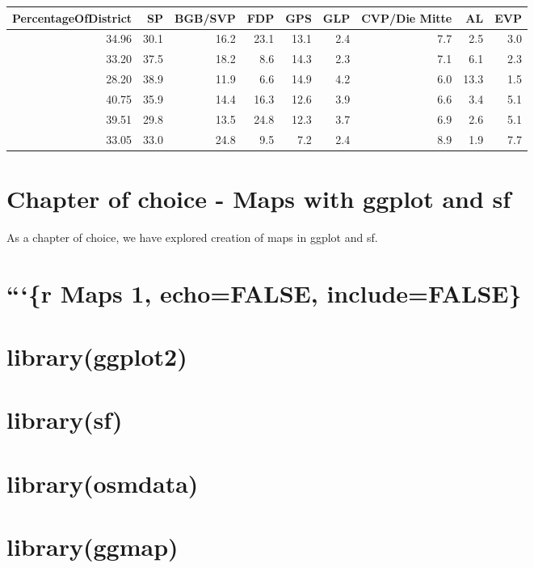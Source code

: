 \documentclass[
]{article}
\begin{document}
\begin{longtable}[]{@{}rrrrrrrrr@{}}
\toprule
PercentageOfDistrict & SP & BGB/SVP & FDP & GPS & GLP & CVP/Die Mitte &
AL & EVP\tabularnewline
\midrule
\endhead
34.96 & 30.1 & 16.2 & 23.1 & 13.1 & 2.4 & 7.7 & 2.5 & 3.0\tabularnewline
33.20 & 37.5 & 18.2 & 8.6 & 14.3 & 2.3 & 7.1 & 6.1 & 2.3\tabularnewline
28.20 & 38.9 & 11.9 & 6.6 & 14.9 & 4.2 & 6.0 & 13.3 & 1.5\tabularnewline
40.75 & 35.9 & 14.4 & 16.3 & 12.6 & 3.9 & 6.6 & 3.4 & 5.1\tabularnewline
39.51 & 29.8 & 13.5 & 24.8 & 12.3 & 3.7 & 6.9 & 2.6 & 5.1\tabularnewline
33.05 & 33.0 & 24.8 & 9.5 & 7.2 & 2.4 & 8.9 & 1.9 & 7.7\tabularnewline
\bottomrule
\end{longtable}

\pagebreak

\hypertarget{chapter-of-choice---maps-with-ggplot-and-sf}{%
\section{Chapter of choice - Maps with ggplot and
sf}\label{chapter-of-choice---maps-with-ggplot-and-sf}}

As a chapter of choice, we have explored creation of maps in ggplot and
sf.

\hypertarget{r-maps-1-echofalse-includefalse}{%
\section{```\{r Maps 1, echo=FALSE,
include=FALSE\}}\label{r-maps-1-echofalse-includefalse}}

\hypertarget{libraryggplot2}{%
\section{library(ggplot2)}\label{libraryggplot2}}

\hypertarget{librarysf}{%
\section{library(sf)}\label{librarysf}}

\hypertarget{libraryosmdata}{%
\section{library(osmdata)}\label{libraryosmdata}}

\hypertarget{libraryggmap}{%
\section{library(ggmap)}\label{libraryggmap}}
\end{document}
